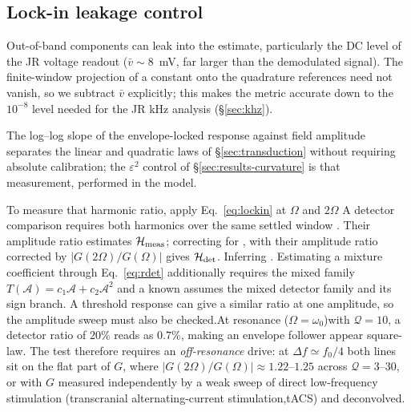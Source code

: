 \documentclass[11pt,a4paper]{article}
\newif\ifjne
\providecommand{\DIFaddtex}[1]{{\protect\color{blue} \sf #1}} %
\providecommand{\DIFdeltex}[1]{{\protect\color{red} \scriptsize #1}} %
\providecommand{\DIFaddbegin}{} %
\providecommand{\DIFaddend}{} %
\providecommand{\DIFdelbegin}{} %
\providecommand{\DIFdelend}{} %
\providecommand{\DIFadd}[1]{\texorpdfstring{\DIFaddtex{#1}}{#1}} %
\providecommand{\DIFdel}[1]{\texorpdfstring{\DIFdeltex{#1}}{}} %
\begin{document}
\ifjne\else
\subsection{\DIFadd{Lock-in leakage control}}\label{supp:lockin}
\DIFaddend Out-of-band components can leak into the estimate, particularly the DC level of the JR voltage readout ($\bar v\!\sim\!8$~mV, far
larger than the demodulated signal). The finite-window projection of a constant onto the quadrature references
need not vanish, so we subtract $\bar v$ explicitly; this makes the metric
accurate down to the $10^{-8}$ level needed for the JR kHz
analysis\DIFdelbegin \DIFdel{(\S\ref{sec:khz})}\DIFdelend .

\DIFdelbegin \DIFdel{The log--log slope of the envelope-locked response
against field amplitude separates the linear and quadratic laws of
\S\ref{sec:transduction} without requiring absolute
calibration; the $\varepsilon^2$ control of \S\ref{sec:results-curvature} is that
measurement, performed in the model.
}\DIFdelend \DIFaddbegin \fi
\DIFaddend

\DIFdelbegin \DIFdel{To measure that harmonic ratio, apply Eq.~\eqref{eq:lockin} at $\Omega$ and $2\Omega$ }\DIFdelend \DIFaddbegin \DIFadd{A detector comparison requires both harmonics }\DIFaddend over the same settled window\DIFdelbegin \DIFdel{. Their amplitude ratio estimates $\mathcal H_{\rm meas}$;
correcting for }\DIFdelend \DIFaddbegin \DIFadd{,
with their amplitude ratio corrected by }\DIFaddend $|G(2\Omega)/G(\Omega)|$\DIFdelbegin \DIFdel{gives $\mathcal H_{\rm det}$.
Inferring }\DIFdelend \DIFaddbegin \DIFadd{.
Estimating }\DIFaddend a mixture coefficient through Eq.~\eqref{eq:rdet} \DIFdelbegin \DIFdel{additionally requires the mixed
family
$T(\mathcal A)=c_1\mathcal A+c_2\mathcal A^2$ and a known }\DIFdelend \DIFaddbegin \DIFadd{assumes the mixed
detector family and its }\DIFaddend sign branch.
\DIFdelbegin \DIFdel{A threshold response can give a similar ratio at one amplitude, so the amplitude sweep must also be checked.At resonance ($\Omega=\omega_0$)with
$\mathcal{Q}=10$, a detector ratio of $20\%$ reads as $0.7\%$, making an envelope
follower appear square-law. The test therefore requires an
\emph{off-resonance} drive:
at $\Delta f\simeq f_0/4$ both lines sit on the flat part of $G$,
where
$|G(2\Omega)/G(\Omega)|\approx1.22$--$1.25$ across $\mathcal{Q}=3$--$30$, or with $G$
measured independently by a weak sweep of direct low-frequency stimulation (transcranial
alternating-current stimulation,tACS) and
deconvolved. }\DIFdelend
\end{document}
